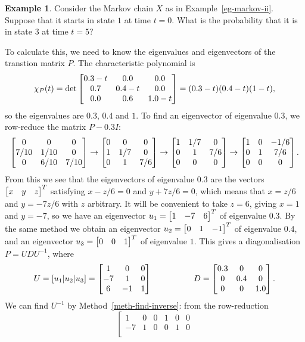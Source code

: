 \documentclass[reqno]{amsart}
\theoremstyle{definition}
\newtheorem{example}[theorem]{Example}
\begin{document}
\begin{example}\label{eg-markov-ii-again}
 Consider the Markov chain $X$ as in Example~\ref{eg-markov-ii}.
 Suppose that it starts in state $1$ at time $t=0$.  What is the
 probability that it is in state $3$ at time $t=5$?

 To calculate this, we need to know the eigenvalues and eigenvectors
 of the transtion matrix $P$.  The characteristic polynomial is
 \[ \chi_P(t) = \det\left[\begin{matrix}
     0.3-t & 0.0 & 0.0 \\
     0.7 & 0.4-t & 0.0 \\
     0.0 & 0.6 & 1.0-t
    \end{matrix}\right] = (0.3-t)(0.4-t)(1-t),
 \]
 so the eigenvalues are $0.3$, $0.4$ and $1$.  To find an eigenvector
 of eigenvalue $0.3$, we row-reduce the matrix $P-0.3I$:
 \[
    \left[\begin{matrix}
     0 & 0 & 0 \\
     7/10 & 1/10 & 0 \\
     0 & 6/10 & 7/10
    \end{matrix}\right]
    \to
    \left[\begin{matrix}
     0 & 0 & 0 \\
     1 & 1/7 & 0 \\
     0 & 1 & 7/6
    \end{matrix}\right]
    \to
    \left[\begin{matrix}
     1 & 1/7 & 0 \\
     0 & 1 & 7/6 \\
     0 & 0 & 0
    \end{matrix}\right]
    \to
    \left[\begin{matrix}
     1 & 0 & -1/6 \\
     0 & 1 & 7/6 \\
     0 & 0 & 0
    \end{matrix}\right].
 \]
 From this we see that the eigenvectors of eigenvalue $0.3$ are the
 vectors $\left[\begin{matrix} x & y & z\end{matrix}\right]^T$ satisfying $x-z/6=0$ and $y+7z/6=0$,
 which means that $x=z/6$ and $y=-7z/6$ with $z$ arbitrary.  It will
 be convenient to take $z=6$, giving $x=1$ and $y=-7$, so we have an
 eigenvector $u_1=\left[\begin{matrix} 1 & -7 & 6\end{matrix}\right]^T$ of eigenvalue $0.3$.  By the
 same method we obtain an eigenvector $u_2=\left[\begin{matrix} 0 & 1 & -1 \end{matrix}\right]^T$ of
 eigenvalue $0.4$, and an eigenvector $u_3=\left[\begin{matrix} 0&0&1\end{matrix}\right]^T$ of
 eigenvalue $1$.  This gives a diagonalisation $P=UDU^{-1}$, where 
 \[ U = [u_1|u_2|u_3]
      = \left[\begin{matrix} 1 & 0 & 0 \\ -7 & 1 & 0 \\ 6 & -1 & 1 \end{matrix}\right]
    \hspace{5em} 
    D = \left[\begin{matrix} 0.3 & 0 & 0 \\ 0 & 0.4 & 0 \\ 0 & 0 & 1.0 \end{matrix}\right].
 \]
 We can find $U^{-1}$ by Method~\ref{meth-find-inverse}: from the
 row-reduction 
 \[ 
  \left[\begin{array}{ccc|ccc}
    1 &  0 &  0 &  1 &  0 &  0 \\
   -7 &  1 &  0 &  0 &  1 &  0 \\

\end{array}\]
\end{example}
\end{document}
